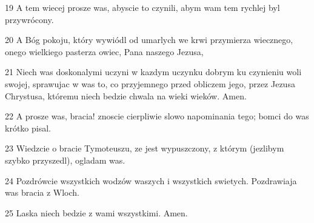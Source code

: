 \par 19 A tem wiecej prosze was, abyscie to czynili, abym wam tem rychlej byl przywrócony.
\par 20 A Bóg pokoju, który wywiódl od umarlych we krwi przymierza wiecznego, onego wielkiego pasterza owiec, Pana naszego Jezusa,
\par 21 Niech was doskonalymi uczyni w kazdym uczynku dobrym ku czynieniu woli swojej, sprawujac w was to, co przyjemnego przed obliczem jego, przez Jezusa Chrystusa, któremu niech bedzie chwala na wieki wieków. Amen.
\par 22 A prosze was, bracia! znoscie cierpliwie slowo napominania tego; bomci do was krótko pisal.
\par 23 Wiedzcie o bracie Tymoteuszu, ze jest wypuszczony, z którym (jezlibym szybko przyszedl), ogladam was.
\par 24 Pozdrówcie wszystkich wodzów waszych i wszystkich swietych. Pozdrawiaja was bracia z Wloch.
\par 25 Laska niech bedzie z wami wszystkimi. Amen.


